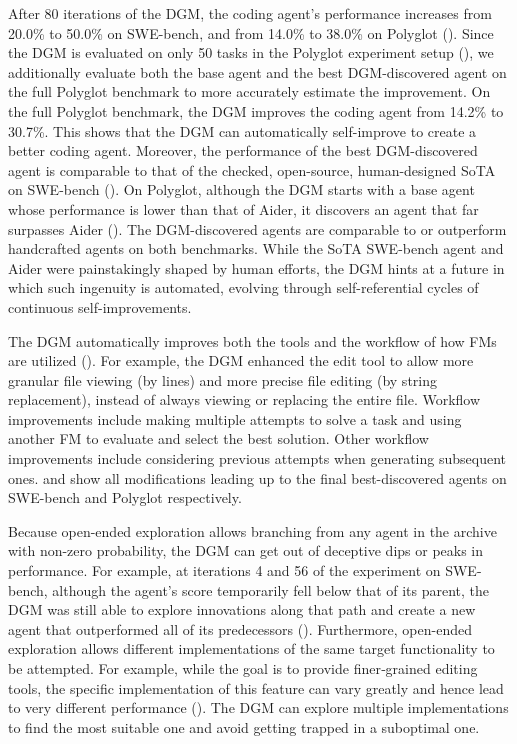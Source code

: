 \documentclass{article}
\begin{document}
After 80 iterations of the DGM, the coding agent's performance increases from 20.0\% to 50.0\% on SWE-bench, and from 14.0\% to 38.0\% on Polyglot (). Since the DGM is evaluated on only 50 tasks in the Polyglot experiment setup (), we additionally evaluate both the base agent and the best DGM-discovered agent on the full Polyglot benchmark to more accurately estimate the improvement. On the full Polyglot benchmark, the DGM improves the coding agent from 14.2\% to 30.7\%. This shows that the DGM can automatically self-improve to create a better coding agent. Moreover, the performance of the best DGM-discovered agent is comparable to that of the checked, open-source, human-designed SoTA on SWE-bench (). On Polyglot, although the DGM starts with a base agent whose performance is lower than that of Aider, it discovers an agent that far surpasses Aider (). The DGM-discovered agents are comparable to or outperform handcrafted agents on both benchmarks. While the SoTA SWE-bench agent and Aider were painstakingly shaped by human efforts, the DGM hints at a future in which such ingenuity is automated, evolving through self-referential cycles of continuous self-improvements.

The DGM automatically improves both the tools and the workflow of how FMs are utilized (). For example, the DGM enhanced the edit tool to allow more granular file viewing (by lines) and more precise file editing (by string replacement), instead of always viewing or replacing the entire file. Workflow improvements include making multiple attempts to solve a task and using another FM to evaluate and select the best solution. Other workflow improvements include considering previous attempts when generating subsequent ones.  and  show all modifications leading up to the final best-discovered agents on SWE-bench and Polyglot respectively. 

Because open-ended exploration allows branching from any agent in the archive with non-zero probability, the DGM can get out of deceptive dips or peaks in performance. For example, at iterations 4 and 56 of the experiment on SWE-bench, although the agent's score temporarily fell below that of its parent, the DGM was still able to explore innovations along that path and create a new agent that outperformed all of its predecessors (). Furthermore, open-ended exploration allows different implementations of the same target functionality to be attempted. For example, while the goal is to provide finer‑grained editing tools, the specific implementation of this feature can vary greatly and hence lead to very different performance (). The DGM can explore multiple implementations to find the most suitable one and avoid getting trapped in a suboptimal one.
\end{document}
